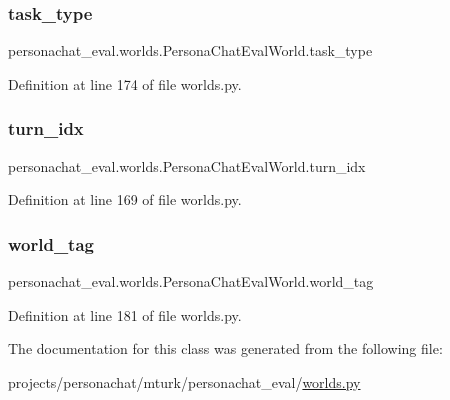\subsubsection{\texorpdfstring{task\+\_\+type}{task\_type}}
{\footnotesize\ttfamily personachat\+\_\+eval.\+worlds.\+Persona\+Chat\+Eval\+World.\+task\+\_\+type}



Definition at line 174 of file worlds.\+py.

\mbox{\label{classpersonachat__eval_1_1worlds_1_1PersonaChatEvalWorld_add33bcde1c71e280efa0a77301e4e552}} 
\subsubsection{\texorpdfstring{turn\+\_\+idx}{turn\_idx}}
{\footnotesize\ttfamily personachat\+\_\+eval.\+worlds.\+Persona\+Chat\+Eval\+World.\+turn\+\_\+idx}



Definition at line 169 of file worlds.\+py.

\mbox{\label{classpersonachat__eval_1_1worlds_1_1PersonaChatEvalWorld_a47e3c2213ce2f77d7aafe62aaf771328}} 
\subsubsection{\texorpdfstring{world\+\_\+tag}{world\_tag}}
{\footnotesize\ttfamily personachat\+\_\+eval.\+worlds.\+Persona\+Chat\+Eval\+World.\+world\+\_\+tag}



Definition at line 181 of file worlds.\+py.



The documentation for this class was generated from the following file\+:\begin{DoxyCompactItemize}
\item 
projects/personachat/mturk/personachat\+\_\+eval/\hyperlink{projects_2personachat_2mturk_2personachat__eval_2worlds_8py}{worlds.\+py}\end{DoxyCompactItemize}
